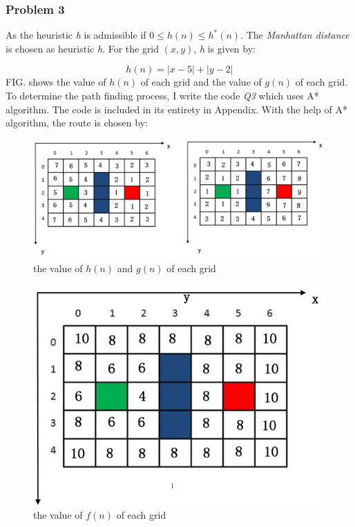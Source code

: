 \documentclass[aps,letterpaper,10pt]{revtex4}
\begin{document}
\subsubsection{Problem 3}
As the heuristic \emph{h} is admissible if $ 0\leq h(n)\leq h^*(n) $. The \emph{Manhattan distance} is chosen as heuristic \emph{h}.
For the grid $(x,y)$, \emph{h} is given by:

$$ h(n)=|x-5|+|y-2|$$
FIG. shows the value of $ h(n) $ of each grid and the value of $ g(n) $ of each grid. 
To determine the path finding process, I write the code \emph{Q3} which uses A* algorithm. The code is included in its entirety in Appendix.
With the help of A* algorithm, the route is chosen by:

\begin{figure}
	\centering
	\includegraphics[scale=0.5]{Astar_h&g.png}
	\caption{the value of $ h(n) $ and $g(n)$ of each grid}
	\label{fig:label}
\end{figure}

\begin{figure}
	\centering
	\includegraphics[scale=0.5]{Astar_f.png}
	\caption{the value of $ f(n) $ of each grid}
	\label{fig:label}
\end{figure}
\end{document}
